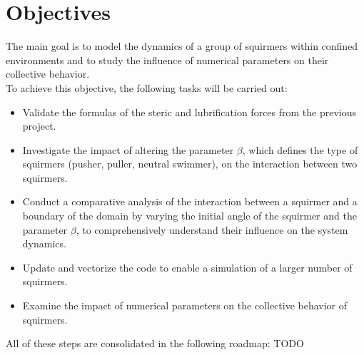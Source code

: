 \documentclass{article}
\begin{document}
\section{Objectives}
The main goal is to model the dynamics of a group of squirmers within confined environments and to
 study the influence of numerical parameters on their collective behavior.\\
 To achieve this objective, the following tasks will be carried out:
 \begin{itemize}
     \item Validate the formulas of the steric and lubrification forces from the previous project.
     \item Investigate the impact of altering the parameter $\beta$, which defines the
    type of squirmers (pusher, puller, neutral swimmer), on the interaction between two squirmers.
     \item Conduct a comparative analysis of the interaction between a squirmer and a 
    boundary of the domain by varying the initial angle of the squirmer and the parameter $\beta$, 
    to comprehensively understand their influence on the system dynamics.
     \item Update and vectorize the code to enable a simulation of a larger number of squirmers.
     \item Examine the impact of numerical parameters on the collective behavior of squirmers.
\end{itemize}
All of these steps are consolidated in the following roadmap:
TODO
 
\newpage
\end{document}
